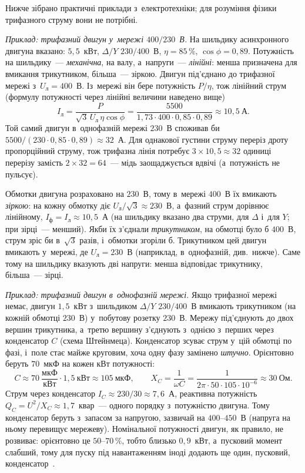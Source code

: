 \begin{Extra}
Нижче зібрано практичні приклади з~електротехніки; для розуміння фізики трифазного струму вони не потрібні.

\emph{Приклад: трифазний двигун у~мережі $400/230$~В.} На шильдику асинхронного двигуна вказано: $5{,}5$~кВт, $\Delta/Y$ $230/400$~В, $\eta = 85\,\%$, $\cos\phi = 0{,}89$. Потужність на шильдику~--- \emph{механічна}, на валу, а~напруги~--- \emph{лінійні}: менша призначена для вмикання трикутником, більша~--- зіркою. Двигун під'єднано до трифазної мережі з~$U_\text{л} = 400$~В. Із~мережі він бере потужність $P/\eta$, тож лінійний струм (формулу потужності через лінійні величини наведено вище)
	\begin{equation*}
		I_\text{л} = \frac{P}{\sqrt3\,U_\text{л}\,\eta\cos\phi} = \frac{5500}{1{,}73\cdot400\cdot0{,}85\cdot0{,}89} \approx 10{,}5~\text{А}.
	\end{equation*}
	Той самий двигун в~однофазній мережі $230$~В споживав би $5500/(230\cdot0{,}85\cdot0{,}89) \approx 32$~А. Для однакової густини струму переріз дроту пропорційний струму, тож трифазна лінія потребує $3\times10{,}5 \approx 32$ одиниці перерізу замість $2\times32 = 64$~--- мідь заощаджується вдвічі (а~потужність не пульсує).

	Обмотки двигуна розраховано на $230$~В, тому в~мережі $400$~В їх вмикають \emph{зіркою}: на кожну обмотку діє $U_\text{л}/\sqrt3 \approx 230$~В, а~фазний струм дорівнює лінійному, $I_\text{ф} = I_\text{л} \approx 10{,}5$~А (на шильдику вказано два струми, для $\Delta$ і~для $Y$; при зірці~--- менший). Якби їх з'єднали \emph{трикутником}, на обмотці було б $400$~В, струм зріс би в~$\sqrt3$ разів, і~обмотки згоріли б. Трикутником цей двигун вмикають у~мережі, де $U_\text{л} = 230$~В (наприклад, в~однофазній, див.\ нижче). Саме тому на шильдику вказують дві напруги: менша відповідає трикутнику, більша~--- зірці.

\emph{Приклад: трифазний двигун в~однофазній мережі.} Якщо трифазної мережі немає, двигун $1{,}5$~кВт з~шильдиком $\Delta/Y$ $230/400$~В вмикають трикутником (на кожній обмотці $230$~В) у~побутову розетку $230$~В. Мережу під'єднують до двох вершин трикутника, а~третю вершину з'єднують з~однією з~перших через конденсатор $C$ (схема Штейнмеца). Конденсатор зсуває струм у~цій обмотці по фазі, і~поле стає майже круговим, хоча одну фазу замінено \emph{штучно}. Орієнтовно беруть $70$~мкФ на кожен кВт потужності:
	\begin{equation*}
		C \approx 70~\frac{\text{мкФ}}{\text{кВт}} \cdot 1{,}5~\text{кВт} \approx 105~\text{мкФ}, \qquad
		X_C = \frac{1}{\omega C} = \frac{1}{2\pi\cdot 50\cdot 105\cdot10^{-6}} \approx 30~\text{Ом}.
	\end{equation*}
	Струм через конденсатор $I_C \approx 230/30 \approx 7{,}6$~А, реактивна потужність $Q_C = U^2/X_C \approx 1{,}7$~квар~--- одного порядку з~потужністю двигуна. Тому конденсатор беруть з~запасом за напругою, зазвичай на $400$--$450$~В (напруга на ньому перевищує мережеву). Номінальної потужності двигун, як правило, не розвиває: орієнтовно це $50$--$70\,\%$, тобто близько $0{,}9$~кВт, а~пусковий момент слабший, тому для пуску під навантаженням іноді додають ще один, пусковий, конденсатор~\cite{Boldea2020Handbook}.


\end{Extra}
